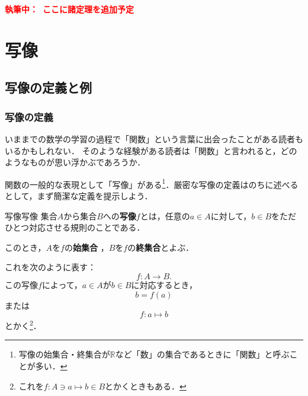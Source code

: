 \documentclass[a4paper,11pt]{ltjsarticle}
\renewcommand{\emph}[1]{\textbf{#1}}
\newcommand{\draftnote}[1]{\begin{center}\textbf{\textcolor{red}{執筆中：~#1}}\end{center}}
\begin{document}
      \draftnote{ここに諸定理を追加予定}

      \newpage 
        \section{写像}

        \subsection{写像の定義と例}

        \subsubsection{写像の定義}

        いままでの数学の学習の過程で「関数」という言葉に出会ったことがある読者もいるかもしれない．
        そのような経験がある読者は「関数」と言われると，どのようなものが思い浮かぶであろうか．

        関数の一般的な表現として「写像」がある\footnote{写像の始集合・終集合が$\mathbb{R}$など「数」の集合であるときに「関数」と呼ぶことが多い．}．厳密な写像の定義はのちに述べるとして，まず簡潔な定義を提示しよう．

        \begin{definition}{写像}{写像}
          集合$A$から集合$B$への\emph{写像}$f$とは，任意の$a \in A$に対して，$b \in B$をただひとつ対応させる規則のことである．

          このとき，$A$を$f$の\emph{始集合} ，$B$を$f$の\emph{終集合}とよぶ．

          これを次のように表す：
          \[
          f \colon A \to B.
          \]
          この写像$f$によって，$a \in A$が$b \in B$に対応するとき，
          \[
          b=f(a) 
          \] 
          または
          \[
          f \colon a \mapsto b
          \]
          とかく\footnote{これを$ f \colon A \ni a \mapsto b \in B$とかくときもある．}．
        \end{definition}
\end{document}
